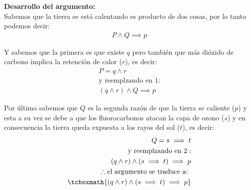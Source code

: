\documentclass[10pt,letterpaper]{article}
\begin{document}
\begin{enumerate}
\begin{enumerate}
            \medskip

            \textbf{Desarrollo del argumento:} \\
            Sabemos que la tierra se está calentando es producto de dos cosas,
            por lo tanto podemos decir:
                \begin{equation} \begin{split}
                    P \land Q \implies p
                \end{split} \end{equation}

            Y sabemos que la primera es que existe $q$ pero también que más dióxido
            de carbono implica la retención de calor ($r$), es decir:
                \begin{equation} \begin{split}
                    P = q \land r \\
                    \text{y reemplzando en 1}: \\
                    (q \land r) \land Q \implies p
                \end{split} \end{equation}

            Por último sabemos que $Q$ es la segunda razón de que la tierra se caliente
            ($p$) y esta a su vez se debe a que los fluorocarbonos atacan la capa de ozono
            ($s$) y en consecuencia la tierra queda expuesta a los rayos del sol ($t$), es decir:
                \begin{equation} \begin{split}
                    Q = s \implies t \\
                    \text{y reemplzando en 2}: \\
                    (q \land r) \land (s \implies t) \implies p \\
                    \therefore \text{el argumento se traduce a: } \\
                    \tcboxmath{(q \land r) \land (s \implies t) \implies p}
                \end{split} \end{equation}
        \end{enumerate}


\end{enumerate}
\end{document}
